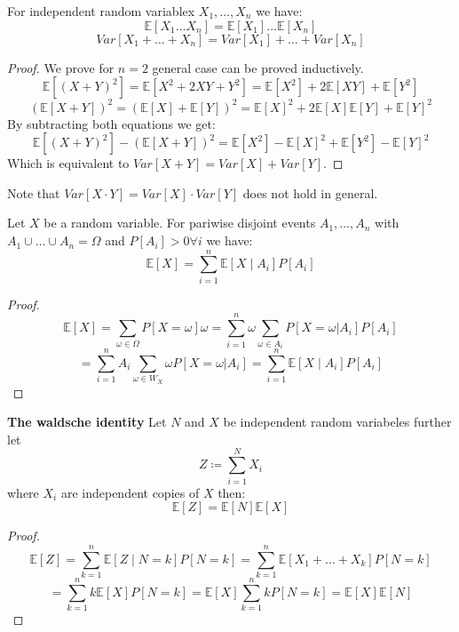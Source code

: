 \begin{theorem}
    For independent random variablex $X_1, \dots , X_n$ we have:
    $$\mathbb{E}[X_1 \dots X_n] = \mathbb{E}[X_1] \dots \mathbb{E}[X_n]$$
    $$Var[X_1 + \dots + X_n] = Var[X_1] + \dots + Var[X_n]$$
\end{theorem}

\begin{proof}
    We prove for $n = 2$ general case can be proved inductively.
    $$\mathbb{E}[(X+Y)^2] = \mathbb{E}[X^2 + 2XY + Y^2] = \mathbb{E}[X^2] + 2\mathbb{E}[XY] + \mathbb{E}[Y^2]$$
    $$(\mathbb{E}[X+Y])^2 = (\mathbb{E}[X] + \mathbb{E}[Y])^2 = \mathbb{E}[X]^2 + 2\mathbb{E}[X]\mathbb{E}[Y] + \mathbb{E}[Y]^2$$
    By subtracting both equations we get:
    $$\mathbb{E}[(X+Y)^2] - (\mathbb{E}[X+Y])^2 = \mathbb{E}[X^2] - \mathbb{E}[X]^2 + \mathbb{E}[Y^2] - \mathbb{E}[Y]^2$$
    Which is equivalent to $Var[X+Y] = Var[X] + Var[Y]$.
\end{proof}

\begin{important}
    Note that $Var[X \cdot Y] = Var[X] \cdot Var[Y]$ does not hold in general.
\end{important}

\begin{theorem}
    Let $X$ be a random variable. For pariwise disjoint events $A_1, \dots, A_n$ with $A_1 \cup \dots \cup A_n = \Omega$  and $P[A_i] > 0 \forall i$ we have:
    $$\mathbb{E}[X] = \sum_{i=1}^n \mathbb{E}[X \mid A_i] P[A_i]$$
\end{theorem}

\begin{proof}
    $$\mathbb{E}[X] = \sum_{\omega \in \Omega} P[X=\omega] \omega = \sum_{i=1}^n \omega \sum_{\omega \in A_i} P[X=\omega | A_i] P[A_i]$$
    $$ = \sum_{i=1}^n A_i \sum_{\omega \in W_X } \omega P[X=\omega | A_i] = \sum_{i=1}^n \mathbb{E}[X \mid A_i] P[A_i]$$
\end{proof}

\begin{theorem}
    \textbf{The waldsche identity}
    Let $N$ and $X$ be independent random variabeles further let
    $$Z \coloneqq \sum_{i=1}^N X_i$$
    where $X_i$ are independent copies of $X$ then:
    $$\mathbb{E}[Z] = \mathbb{E}[N] \mathbb{E}[X]$$
\end{theorem}

\begin{proof}
    $$\mathbb{E}[Z] = \sum_{k=1}^n \mathbb{E}[Z \mid N=k] P[N=k] = \sum_{k=1}^n \mathbb{E}[X_1 + \dots + X_k] P[N=k]$$
    $$= \sum_{k=1}^n k \mathbb{E}[X] P[N=k] = \mathbb{E}[X] \sum_{k=1}^n k P[N=k] = \mathbb{E}[X] \mathbb{E}[N]$$
\end{proof}

